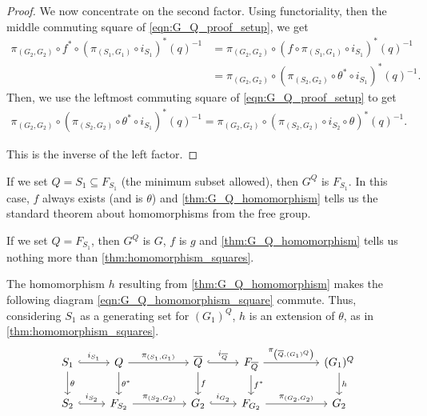 \begin{proof}
	We now concentrate on the second factor. Using functoriality, then the middle commuting square of \eqref{eqn:G_Q_proof_setup}, we get
	\begin{align*}
		\pi_{(G_2,G_2)} \circ f^* \circ\left( \pi_{(S_1,G_1)} \circ i_{S_1}\right)^*(q)^{-1} &= \pi_{(G_2,G_2)} \circ \left( f \circ \pi_{(S_1,G_1)} \circ i_{S_1}\right)^*(q)^{-1}
												  \\ &= \pi_{(G_2,G_2)} \circ \left(\pi_{(S_2,G_2)} \circ \theta^* \circ i_{S_1}\right)^*(q)^{-1}.
	\end{align*}
	Then, we use the leftmost commuting square of \eqref{eqn:G_Q_proof_setup} to get
	\begin{align*}
		\pi_{(G_2,G_2)} \circ \left(\pi_{(S_2,G_2)} \circ \theta^* \circ i_{S_1}\right)^*(q)^{-1} = \pi_{(G_2,G_2)} \circ \left(\pi_{(S_2,G_2)} \circ i_{S_2} \circ \theta \right)^*(q)^{-1}.
	\end{align*}

	This is the inverse of the left factor.
\end{proof}

\begin{remark}
	If we set $Q = S_1 \subseteq F_{S_1}$ (the minimum subset allowed), then  $G^Q$ is  $F_{S_1}$.
	In this case, $f$ always exists (and is  $\theta$) and \cref{thm:G_Q_homomorphism} tells us the standard theorem about homomorphisms from the free group.
\end{remark}

\begin{remark}
	If we set $Q = F_{S_1}$, then $G^Q$ is  $G$, $f$ is $g$ and \cref{thm:G_Q_homomorphism} tells us nothing more than  \cref{thm:homomorphism_squares}.
\end{remark}

\begin{corollary}
	The homomorphism $h$ resulting from \cref{thm:G_Q_homomorphism} makes the following diagram \eqref{eqn:G_Q_homomorphism_square} commute.
	Thus, considering $S_1$ as a generating set for  $(G_1)^Q$, $h$ is an extension of $\theta$, as in \cref{thm:homomorphism_squares}.
	\begin{equation}
		\begin{tikzcd}
			S_1 \ar[d, "\theta"] \ar[r, hook, "i_{S_1}"] & Q \ar[d, "\theta^*"] \ar[rr, "\pi_{(S_1, G_1)}"] & & \overline{Q} \ar[d, "f"] \ar[r, hook, "i_{\overline{Q}}"] & F_{\overline{Q}} \ar[d, "f^*"] \ar[rr, "\pi_{\left(\overline{Q}, (G_1)^Q\right)}"] & & (G_1)^Q \ar[d, "h"]
			\\ S_2 \ar[r, hook, "i_{S_2}"] & F_{S_2} \ar[rr, "\pi_{(S_2, G_2)}"] & & G_2 \ar[r, hook, "i_{G_2}"] & F_{G_2} \ar[rr, "\pi_{(G_2, G_2)}"] & & G_2
		\end{tikzcd}
		\label{eqn:G_Q_homomorphism_square}
	\end{equation}
\end{corollary}

